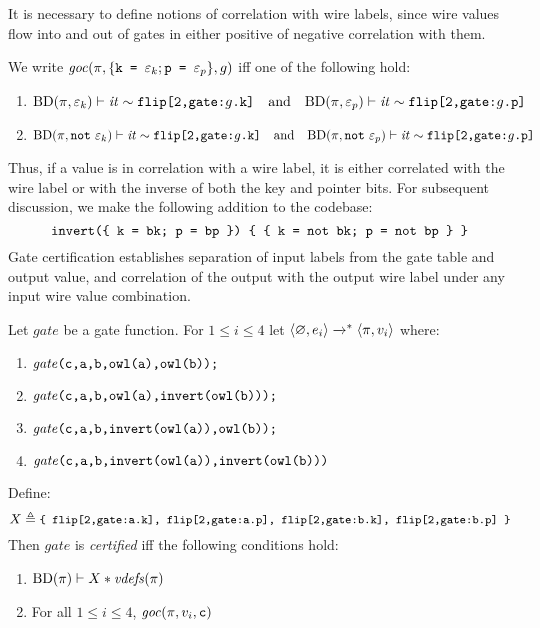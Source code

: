 It is necessary to define notions of correlation with wire
labels, since wire values flow into and out of gates in either
positive of negative correlation with them.
\begin{definition}
  \label{definition-gc}
  We write $\mathit{goc}(\pi,\{ \texttt{k = }\varepsilon_{k}; \texttt{p = }\varepsilon_{p} \},g)$ iff one of the
  following hold:
  \begin{enumerate}[\hspace{5mm}i.]
  \item $\mathrm{BD}(\pi,\varepsilon_k) \vdash \mathit{it} \sim \texttt{flip[2,gate:}g\texttt{.k]}\quad \text{and} \quad
    \mathrm{BD}(\pi,\varepsilon_p) \vdash \mathit{it} \sim \texttt{flip[2,gate:}g\texttt{.p]}$
  \item $\vc{\progtt(\prog,\enot\ \be_k)}{\itv}{\ttt{flip[2,gate:}g\ttt{.k]}}\quad \text{and}\quad
    \vc{\progtt(\prog,\enot\ \be_p)}{\itv}{\ttt{flip[2,gate:}g\ttt{.p]}}$
  \end{enumerate}
\end{definition}
Thus, if a value is in correlation with a wire label, it is either
correlated with the wire label or with the inverse of both the key and
pointer bits. For subsequent discussion, we make the following addition
to the codebase:
$$
\texttt{invert(\{ k = bk; p = bp \}) \{ \{ k = not bk; p = not bp \} \}}
$$
Gate certification establishes separation of input labels from the
gate table and output value, and correlation of the output with
the output wire label under any input wire value combination.
\begin{definition}
  \label{definition-ygcgate-certification}
  Let $\mathit{gate}$ be a gate function.
  For $1 \le i \le 4$  let
  $
  \langle \varnothing,e_i \rangle\xrightarrow{}^{*}\langle \pi,v_i \rangle
  $
  where:
  \begin{enumerate}
    \item $\mathit{gate}\texttt{(c,a,b,owl(a),owl(b));}$
    \item $\mathit{gate}\texttt{(c,a,b,owl(a),invert(owl(b)));}$
    \item $\mathit{gate}\texttt{(c,a,b,invert(owl(a)),owl(b));}$
    \item $\mathit{gate}\texttt{(c,a,b,invert(owl(a)),invert(owl(b)))}$
  \end{enumerate}
  Define:
  $${\small X \triangleq \texttt{\{ flip[2,gate:a.k], flip[2,gate:a.p], flip[2,gate:b.k], flip[2,gate:b.p] \}}}$$
  Then $\mathit{gate}$ is \emph{certified} iff the following conditions hold:
  \begin{enumerate}[\hspace{5mm}i.]
  \item $\mathrm{BD}(\pi) \vdash X * \mathit{vdefs}(\pi)$
  \item For all $1 \le i \le 4$, $\mathit{goc}(\pi,v_i,\texttt{c})$
  \end{enumerate}
\end{definition}
